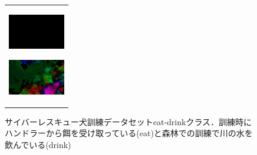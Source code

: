 \begin{enumerate}
\begin{end}
\begin{figure}[H]
\begin{tabular}{l}
      \begin{minipage}{0.165\hsize}
        \begin{center}
          \includegraphics[clip, width=2.5cm]{./Figures/optic_drink4.eps}
          \hspace{0.1cm} { }
        \end{center}
      \end{minipage}
      \begin{minipage}{0.165\hsize}
        \begin{center}
          \includegraphics[clip, width=2.5cm]{./Figures/optic_drink5.eps}
          \hspace{2.2cm} { }
        \end{center}
      \end{minipage}
    \end{tabular}
    \caption{サイバーレスキュー犬訓練データセットeat-drinkクラス．訓練時にハンドラーから餌を受け取っている(eat)と森林での訓練で川の水を飲んでいる(drink)}
    \label{eat-drink}
\end{figure}

\begin{figure}[H]
    \begin{tabular}{l}


\end{tabular}
\end{figure}
\end{end}
\end{enumerate}
